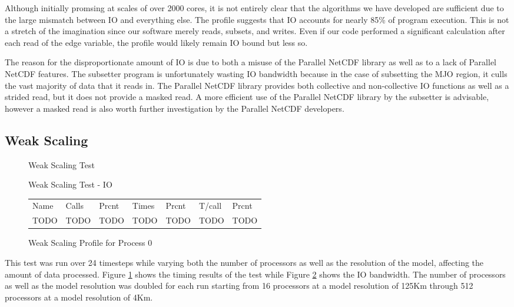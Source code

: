 Although initially promsing at scales of over 2000 cores, it is not entirely
clear that the algorithms we have developed are sufficient due to the large
mismatch between IO and everything else.  The profile suggests that IO
accounts for nearly 85\% of program execution.  This is not a stretch of the
imagination since our software merely reads, subsets, and writes.  Even if our
code performed a significant calculation after each read of the edge variable,
the profile would likely remain IO bound but less so.

The reason for the disproportionate amount of IO is due to both a misuse of
the Parallel NetCDF library as well as to a lack of Parallel NetCDF features.
The subsetter program is unfortunately wasting IO bandwidth because in the
case of subsetting the MJO region, it culls the vast majority of data that it
reads in.  The Parallel NetCDF library provides both collective and
non-collective IO functions as well as a strided read, but it does not provide
a masked read.  A more efficient use of the Parallel NetCDF library by the
subsetter is advisable, however a masked read is also worth further
investigation by the Parallel NetCDF developers.

\subsection{Weak Scaling}

\begin{figure}[!t]
\center
{}
\caption{Weak Scaling Test}
\label{fig:weak}
\end{figure}

\begin{figure}[!t]
\center
{}
\caption{Weak Scaling Test - IO}
\label{fig:weak_io}
\end{figure}

\begin{figure*}[!t]
\center
\begin{tabular}{lllllll}
Name&Calls&Prcnt&Times&Prcnt&T/call&Prcnt\\
TODO&TODO&TODO&TODO&TODO&TODO&TODO\\
\end{tabular}
\caption{Weak Scaling Profile for Process 0}
\label{fig:weak_prof}
\end{figure*}

This test was run over 24 timesteps while varying both the number of
processors as well as the resolution of the model, affecting the amount of
data processed.  Figure \ref{fig:weak} shows the timing results of the test
while Figure \ref{fig:weak_io} shows the IO bandwidth.  The number of
processors as well as the model resolution was doubled for each run starting
from 16 processors at a model resolution of 125Km through 512 processors at a
model resolution of 4Km.
